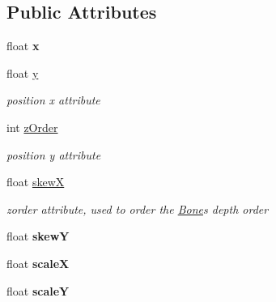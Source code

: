 \subsection*{Public Attributes}
\begin{DoxyCompactItemize}
\item 
\mbox{\label{classcocostudio_1_1BaseData_ae45364707344f5ff60b9b2108ba0e68d}} 
float {\bfseries x}
\item 
\mbox{\label{classcocostudio_1_1BaseData_a7c5b0431cf7d4258f71847a4cf4e7ee2}} 
float \hyperlink{classcocostudio_1_1BaseData_a7c5b0431cf7d4258f71847a4cf4e7ee2}{y}
\begin{DoxyCompactList}\small\item\em position x attribute \end{DoxyCompactList}\item 
\mbox{\label{classcocostudio_1_1BaseData_afad681b3e44b3304215f3376c2b36197}} 
int \hyperlink{classcocostudio_1_1BaseData_afad681b3e44b3304215f3376c2b36197}{z\+Order}
\begin{DoxyCompactList}\small\item\em position y attribute \end{DoxyCompactList}\item 
float \hyperlink{classcocostudio_1_1BaseData_af54c45a63e59420ba37ae0ee83cd82ed}{skewX}
\begin{DoxyCompactList}\small\item\em zorder attribute, used to order the \hyperlink{classcocostudio_1_1Bone}{Bone}\textquotesingle{}s depth order \end{DoxyCompactList}\item 
\mbox{\label{classcocostudio_1_1BaseData_a395e27611973c68542e6f2d4fd68c12d}} 
float {\bfseries skewY}
\item 
\mbox{\label{classcocostudio_1_1BaseData_a384e347e9cce032f9a1f4b5c910270f8}} 
float {\bfseries scaleX}
\item 
\mbox{\label{classcocostudio_1_1BaseData_a746eec098d5a00773c1b59b103c089f6}} 
float {\bfseries scaleY}
\item 
\mbox{\label{classcocostudio_1_1BaseData_afa41a036881dc414a63dd1fd18b09d77}} 

\end{DoxyCompactItemize}
